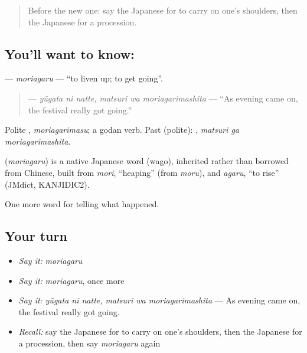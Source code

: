 \label{lesson:JA-C294-moriagaru}



\begin{quote}
Before the new one: say the Japanese for to carry on one's shoulders, then the Japanese for a procession.
\end{quote}

\subsection*{You'll want to know: }
\textbf{} — \emph{moriagaru} — \textquotedblleft{}to liven up; to get going\textquotedblright{}.

\begin{quote}
\textbf{  } — \emph{yūgata ni natte, matsuri wa moriagarimashita} — \textquotedblleft{}As evening came on, the festival really got going.\textquotedblright{}
\end{quote}

Polite \textbf{}, \emph{moriagarimasu}; a godan verb. Past (polite): \textbf{ }, \emph{matsuri ga moriagarimashita}.

\begin{cousinweb}
\textbf{} (\emph{moriagaru}) is a native Japanese word (wago), inherited rather than borrowed from Chinese, built from \emph{mori}, \textquotedblleft{}heaping\textquotedblright{} (from \emph{moru}), and \emph{agaru}, \textquotedblleft{}to rise\textquotedblright{} (JMdict, KANJIDIC2).
\end{cousinweb}

\begin{grammarlens}[title={What you've built}]
One more word for telling what happened.
\end{grammarlens}

\subsection*{Your turn}
\begin{itemize}
\raggedright
  \item \emph{Say it:} \emph{moriagaru}
  \item \emph{Say it:} \emph{moriagaru}, once more
  \item \emph{Say it:} \emph{yūgata ni natte, matsuri wa moriagarimashita} — As evening came on, the festival really got going.
  \item \emph{Recall:} say the Japanese for to carry on one's shoulders, then the Japanese for a procession, then say \emph{moriagaru} again
\end{itemize}

